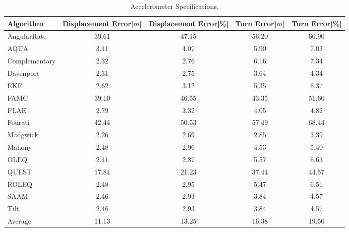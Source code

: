 \begin{table}[H]
    \begin{center}
        \begin{tabular}[t]{lcccc}
            \hline
            Algorithm                   & Displacement Error[$m$] & Displacement Error[\%]      & Turn Error[$m$]  & Turn Error[\%]             \\
            \hline 
            AngularRate            & 39.61  & 47.15 & 56.20 & 66.90              \\            AQUA            & 3.41  & 4.07 & 5.90 & 7.03              \\            Complementary            & 2.32  & 2.76 & 6.16 & 7.34              \\            Davenport            & 2.31  & 2.75 & 3.64 & 4.34              \\            EKF            & 2.62  & 3.12 & 5.35 & 6.37              \\            FAMC            & 39.10  & 46.55 & 43.35 & 51.60              \\            FLAE            & 2.79  & 3.32 & 4.05 & 4.82              \\            Fourati            & 42.44  & 50.53 & 57.49 & 68.44              \\            Madgwick            & 2.26  & 2.69 & 2.85 & 3.39              \\            Mahony            & 2.48  & 2.96 & 4.53 & 5.40              \\            OLEQ            & 2.41  & 2.87 & 5.57 & 6.63              \\            QUEST            & 17.84  & 21.23 & 37.44 & 44.57              \\            ROLEQ            & 2.48  & 2.95 & 5.47 & 6.51              \\            SAAM            & 2.46  & 2.93 & 3.84 & 4.57              \\            Tilt            & 2.46  & 2.93 & 3.84 & 4.57              \\
            \hline
            Average & 11.13 & 13.25 & 16.38 & 19.50
        \end{tabular}
        \caption{Accelerometer Specifications. }
        \label{tab:accelerometer_specification}
    \end{center}
\end{table}